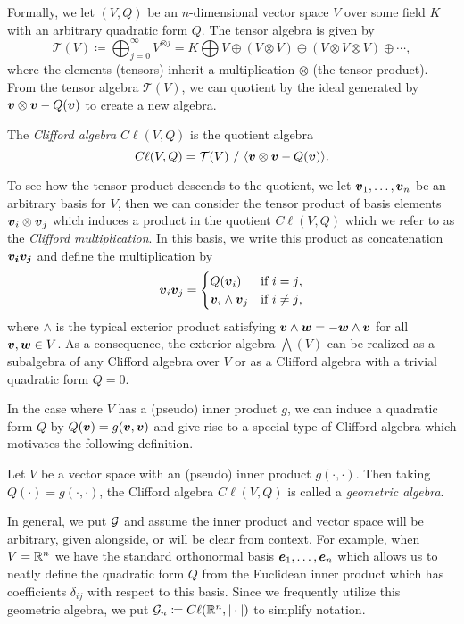 Formally, we let $(V,Q)$ be an $n$-dimensional vector space $V$ over some field $K$ with an arbitrary quadratic form $Q$.  The tensor algebra is given by
\begin{equation}
\mathcal{T}(V) \coloneqq \bigoplus_{j=0}^\infty V^{\otimes j} = K \bigoplus V \oplus (V\otimes V) \oplus (V\otimes V \otimes V) \oplus \cdots,
\end{equation}
where the elements (tensors) inherit a multiplication $\otimes$ (the tensor product). From the tensor algebra $\mathcal{T}(V)$, we can quotient by the ideal generated by $\boldsymbol{v}\otimes \boldsymbol{v} - Q(\boldsymbol{v})$ to create a new algebra.
\begin{definition}
The \emph{Clifford algebra} $C\ell(V,Q)$ is the quotient algebra
\begin{equation}
C\ell(V,Q) = \mathcal{T}(V) ~ / ~ \langle \boldsymbol{v} \otimes \boldsymbol{v} - Q(\boldsymbol{v}) \rangle.
\end{equation}
\end{definition}
To see how the tensor product descends to the quotient, we let $\boldsymbol{v}_1, \dots, \boldsymbol{v}_n$ be an arbitrary basis for $V$, then we can consider the tensor product of basis elements $\boldsymbol{v}_i \otimes \boldsymbol{v}_j$ which induces a product in the quotient $C\ell(V,Q)$ which we refer to as the \emph{Clifford multiplication}. In this basis, we write this product as concatenation $\boldsymbol{v_i}\boldsymbol{v_j}$ and define the multiplication by
\begin{equation}
\label{eq:clifford_multiplication}
\boldsymbol{v}_i \boldsymbol{v}_j = \begin{cases} Q(\boldsymbol{v}_i) & \textrm{if $i=j$}, \\ \boldsymbol{v}_i \wedge \boldsymbol{v}_j & \textrm{if $i\neq j$},\end{cases}
\end{equation}
where $\wedge$ is the typical exterior product satisfying $\boldsymbol{v}\wedge \boldsymbol{w} = - \boldsymbol{w}\wedge \boldsymbol{v}$ for all $\boldsymbol{v},\boldsymbol{w}\in V$.  As a consequence, the exterior algebra $\bigwedge(V)$ can be realized as a subalgebra of any Clifford algebra over $V$ or as a Clifford algebra with a trivial quadratic form $Q=0$.  

In the case where $V$ has a (pseudo) inner product $g$, we can induce a quadratic form $Q$ by $Q(\boldsymbol{v})=g(\boldsymbol{v},\boldsymbol{v})$ and give rise to a special type of Clifford algebra which motivates the following definition.
\begin{definition}
Let $V$ be a vector space with an (pseudo) inner product $g(\cdot,\cdot)$. Then taking $Q(\cdot) = g(\cdot,\cdot)$, the Clifford algebra $C \ell(V,Q)$ is called a \emph{geometric algebra}.
\end{definition}
In general, we put $\mathcal{G}$ and assume the inner product and vector space will be arbitrary, given alongside, or will be clear from context.  For example, when $V=\mathbb{R}^n$ we have the standard orthonormal basis $\boldsymbol{e}_1,\dots,\boldsymbol{e}_n$ which allows us to neatly define the quadratic form $Q$ from the Euclidean inner product which has coefficients $\delta_{ij}$ with respect to this basis. Since we frequently utilize this geometric algebra, we put $\mathcal{G}_n \coloneqq C\ell(\mathbb{R}^n, |\cdot|)$ to simplify notation. 

